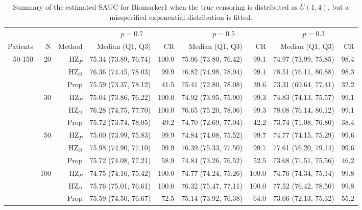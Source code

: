 \begin{table}[!htb]

\caption{\label{tab:sauc3}Summary of the estimated SAUC for Biomarker1 when the true censoring is distributed as $U(1,4)$, but a misspecified exponential distribution is fitted.}
\centering
\begin{threeparttable}
\begin{tabular}[t]{rrrrrrrrr}
\toprule
\multicolumn{1}{c}{} & \multicolumn{1}{c}{} & \multicolumn{1}{c}{} & \multicolumn{2}{c}{$p = 0.7$} & \multicolumn{2}{c}{$p = 0.5$} & \multicolumn{2}{c}{$p = 0.3$} \\
\cmidrule(l{3pt}r{3pt}){4-5} \cmidrule(l{3pt}r{3pt}){6-7} \cmidrule(l{3pt}r{3pt}){8-9}
Patients & N & Method & Median (Q1, Q3) & CR & Median (Q1, Q3) & CR & Median (Q1, Q3) & CR\\
\midrule
50-150 & 20 & HZ$_P$ & 75.34 (73.89, 76.74) & 100.0 & 75.06 (73.80, 76.42) & 99.1 & 74.97 (73.99, 75.85) & 98.4\\
 &  & HZ$_O$ & 76.36 (74.45, 78.03) & 99.9 & 76.82 (74.98, 78.94) & 99.1 & 78.51 (76.11, 80.88) & 98.3\\
 &  & Prop & 75.59 (73.37, 78.12) & 41.5 & 75.41 (72.80, 78.08) & 39.6 & 73.31 (69.64, 77.41) & 32.2\\
\addlinespace
 & 30 & HZ$_P$ & 75.04 (73.86, 76.22) & 100.0 & 74.92 (73.95, 75.90) & 99.3 & 74.83 (74.13, 75.57) & 99.1\\
 &  & HZ$_O$ & 76.28 (74.75, 77.70) & 100.0 & 76.65 (75.20, 78.06) & 99.3 & 78.08 (76.14, 80.12) & 99.1\\
 &  & Prop & 75.72 (73.74, 78.05) & 49.2 & 74.70 (72.69, 77.04) & 42.2 & 73.74 (71.08, 76.80) & 38.4\\
\addlinespace
 & 50 & HZ$_P$ & 75.00 (73.99, 75.83) & 99.9 & 74.84 (74.08, 75.52) & 99.7 & 74.77 (74.15, 75.29) & 99.6\\
 &  & HZ$_O$ & 75.98 (74.90, 77.10) & 99.9 & 76.39 (75.33, 77.50) & 99.7 & 77.61 (76.20, 79.14) & 99.6\\
 &  & Prop & 75.72 (74.08, 77.21) & 58.9 & 74.84 (73.26, 76.52) & 52.5 & 73.68 (71.51, 75.56) & 46.2\\
\addlinespace
 & 100 & HZ$_P$ & 74.75 (74.16, 75.42) & 100.0 & 74.77 (74.24, 75.26) & 100.0 & 74.76 (74.34, 75.14) & 99.8\\
 &  & HZ$_O$ & 75.76 (75.01, 76.61) & 100.0 & 76.32 (75.47, 77.11) & 100.0 & 77.52 (76.42, 78.50) & 99.8\\
 &  & Prop & 75.59 (74.50, 76.67) & 72.5 & 75.14 (73.92, 76.38) & 64.0 & 73.66 (72.13, 75.32) & 55.2\\

\end{tabular}
\end{threeparttable}
\end{table}
